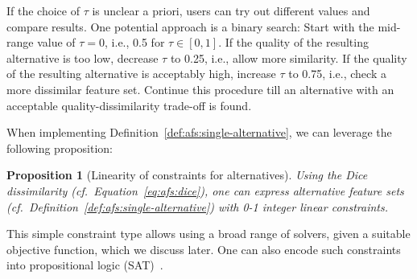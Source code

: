 \documentclass{article}
\newtheorem{proposition}{Proposition}
\theoremstyle{definition}
\begin{document}
If the choice of $\tau$ is unclear a priori, users can try out different values and compare results.
One potential approach is a binary search:
Start with the mid-range value of $\tau=0$, i.e., 0.5 for $\tau \in [0,1]$.
If the quality of the resulting alternative is too low, decrease $\tau$ to 0.25, i.e., allow more similarity.
If the quality of the resulting alternative is acceptably high, increase $\tau$ to 0.75, i.e., check a more dissimilar feature set.
Continue this procedure till an alternative with an acceptable quality-dissimilarity trade-off is found.

When implementing Definition~\ref{def:afs:single-alternative}, we can leverage the following proposition:
%
\begin{proposition}[Linearity of constraints for alternatives]
	Using the Dice dissimilarity (cf.~Equation~\ref{eq:afs:dice}), one can express alternative feature sets (cf.~Definition~\ref{def:afs:single-alternative}) with 0-1 integer linear constraints.
	\label{prop:afs:linear-constraints}
\end{proposition}
%
This simple constraint type allows using a broad range of solvers, given a suitable objective function, which we discuss later.
One can also encode such constraints into propositional logic (\textsc{SAT})~\cite{ulrich2022selecting}.
%
\end{document}
